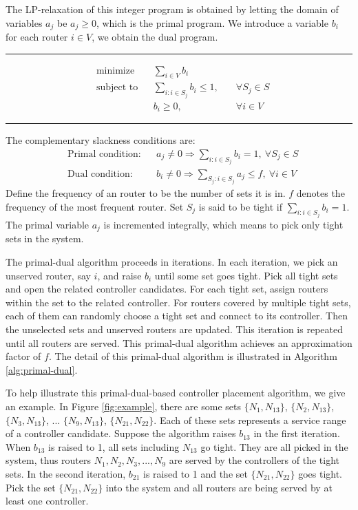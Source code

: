 \documentclass[conference]{IEEEtran}
\begin{document}
The LP-relaxation of this integer program is obtained by letting the domain of variables $a_j$ be $a_j\ge 0$, which is the primal program. We introduce a variable $b_i$ for each router $i\in V$, we obtain the dual program.
\rule{0.5\textwidth}{0.5pt}
\begin{equation}
\begin{aligned}
& \text{minimize} & & \sum_{i\in V}b_i \\
& \text{subject to} & &  \sum_{i: i\in S_j}b_i \leq 1, \quad & \forall S_j\in S \\
& & & b_i\ge 0, \quad & \forall i\in V
\end{aligned}
\end{equation}
\rule{0.5\textwidth}{0.5pt}

The complementary slackness conditions are:
\begin{equation}
\begin{aligned}
& \text{Primal condition:} & & a_j\ne 0 \Rightarrow \sum_{i: i\in S_j}b_i=1, \ \forall S_j\in S\\
& \text{Dual condition:} & & b_i\ne 0 \Rightarrow \sum_{S_j: i\in S_j}a_j\leq f, \ \forall i\in V 
\end{aligned}
\end{equation}
Define the frequency of an router to be the number of sets it is in. $f$ denotes the frequency of the most frequent router. Set $S_j$ is said to be tight if $\sum_{i: i\in S_j}b_i=1$. The primal variable $a_j$ is incremented integrally, which means to pick only tight sets in the system. 

The primal-dual algorithm proceeds in iterations. In each iteration, we pick an unserved router, say $i$, and raise $b_i$ until some set goes tight. Pick all tight sets and open the related controller candidates. For each tight set, assign routers within the set to the related controller. For routers covered by multiple tight sets, each of them can randomly choose a tight set and connect to its controller. Then the unselected sets and unserved routers are updated. This iteration is repeated until all routers are served. This primal-dual algorithm achieves an approximation factor of $f$. The detail of this primal-dual algorithm is illustrated in Algorithm \ref{alg:primal-dual}.

To help illustrate this primal-dual-based controller placement algorithm, we give an example. In Figure \ref{fig:example}, there are some sets $\{N_1, N_{13}\}$, $\{N_2, N_{13}\}$, $\{N_3, N_{13}\}$, ... $\{N_9, N_{13}\}$, $\{N_{21}, N_{22}\}$. Each of these sets represents a service range of a controller candidate. Suppose the algorithm raises $b_{13}$ in the first iteration. When $b_{13}$ is raised to 1, all sets including $N_{13}$ go tight. They are all picked in the system, thus routers $N_1, N_2, N_3, ..., N_9$ are served by the controllers of the tight sets. In the second iteration, $b_{21}$ is raised to 1 and the set $\{N_{21}, N_{22}\}$ goes tight. Pick the set  $\{N_{21}, N_{22}\}$ into the system and all routers are being served by at least one controller. 
\end{document}
